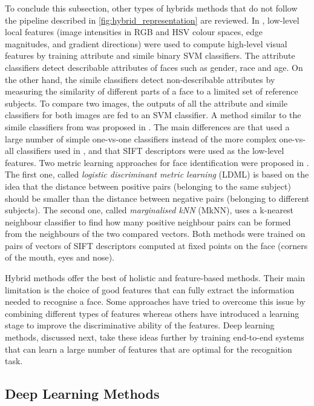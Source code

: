 \documentclass[conference]{IEEEtran}
\begin{document}
To conclude this subsection, other types of hybrids methods that do not follow the pipeline described in \cref{fig:hybrid_representation} are reviewed. In \cite{kumar2009attribute}, low-level local features (image intensities in RGB and HSV colour spaces, edge magnitudes, and gradient directions) were used to compute high-level visual features by training attribute and simile binary SVM classifiers. The attribute classifiers detect describable attributes of faces such as gender, race and age. On the other hand, the simile classifiers detect non-describable attributes by measuring the similarity of different parts of a face to a limited set of reference subjects. To compare two images, the outputs of all the attribute and simile classifiers for both images are fed to an SVM classifier. A method similar to the simile classifiers from \cite{kumar2009attribute} was proposed in \cite{berg2012tom}. The main differences are that \cite{berg2012tom} used a large number of simple one-vs-one classifiers instead of the more complex one-vs-all classifiers used in \cite{kumar2009attribute}, and that SIFT descriptors were used as the low-level features. Two metric learning approaches for face identification were proposed in \cite{guillaumin2009you}. The first one, called \textit{logistic discriminant metric learning} (LDML) is based on the idea that the distance between positive pairs (belonging to the same subject) should be smaller than the distance between negative pairs (belonging to different subjects). The second one, called \textit{marginalised kNN} (MkNN), uses a k-nearest neighbour classifier to find how many positive neighbour pairs can be formed from the neighbours of the two compared vectors. Both methods were trained on pairs of vectors of SIFT descriptors computed at fixed points on the face (corners of the mouth, eyes and nose).

Hybrid methods offer the best of holistic and feature-based methods. Their main limitation is the choice of good features that can fully extract the information needed to recognise a face. Some approaches have tried to overcome this issue by combining different types of features whereas others have introduced a learning stage to improve the discriminative ability of the features. Deep learning methods, discussed next, take these ideas further by training end-to-end systems that can learn a large number of features that are optimal for the recognition task.

\subsection{Deep Learning Methods}
\label{deep_learning_methods}
\end{document}
